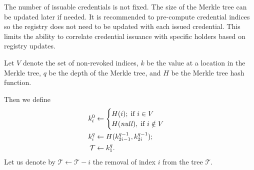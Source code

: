 \documentclass[a4paper]{article}
\begin{document}
The number of issuable credentials is not fixed. The size of the Merkle tree can be updated later if needed. It is recommended to pre-compute credential indices so the registry does not need to be updated with each issued credential. This limits the ability to correlate credential issuance with specific holders based on registry updates.

Let $V$ denote the set of non-revoked indices, $k$ be the value at a location in the Merkle tree, $q$ be the depth of the Merkle tree, and $H$ be the Merkle tree hash function.

Then we define
\begin{align*}
    k^0_{i} &\leftarrow 
    \begin{cases}
        H(i);\;\text{if $i\in V$}\\
        H($\emph{null}$),\;\text{if $i\notin V$}
    \end{cases}\\
    k^q_{i} &\leftarrow H(k^{q-1}_{2i-1},k^{q-1}_{2i});\\
    \mathcal{T} &\leftarrow k^q_1.
\end{align*}
Let us denote by $\mathcal{T}\leftarrow\mathcal{T}-i$ the removal of index $i$ from the tree $\mathcal{T}$.
\end{document}
